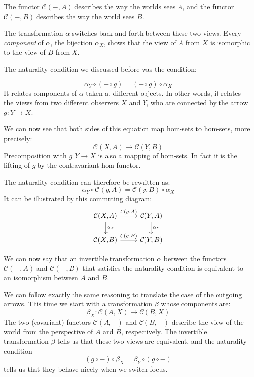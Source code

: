 \documentclass[DaoFP]{subfiles}
\begin{document}
The functor $\mathcal{C}(-, A)$ describes the way the worlds sees $A$, and the functor $\mathcal{C}(-, B)$ describes the way the world sees $B$. 

The transformation $\alpha$ switches back and forth between these two views. Every \emph{component} of $\alpha$, the bijection $\alpha_X$, shows that the view of $A$ from $X$ is isomorphic to the view of $B$ from $X$. 

The naturality condition we discussed before was the condition:

\[ \alpha_Y \circ (- \circ g) = (- \circ g) \circ \alpha_X \]
It relates components of $\alpha$ taken at different objects. In other words, it relates the views from two different observers $X$ and $Y$, who are connected by the arrow $g \colon Y \to X$. 

We can now see that both sides of this equation map hom-sets to hom-sets, more precisely:
\[\mathcal{C}(X, A) \to \mathcal{C}(Y, B)\]
Precomposition with $g \colon Y \to X$ is also a mapping of hom-sets. In fact it is the lifting of $g$ by the contravariant hom-functor. 

The naturality condition can therefore be rewritten as:
\[ \alpha_Y \circ \mathcal{C}(g, A) = \mathcal{C}(g, B) \circ \alpha_X \]
It can be illustrated by this commuting diagram:
\[
 \begin{tikzcd}
 \mathcal{C}(X, A)
 \arrow[d, "\alpha_X"]
 \arrow[r, "{\mathcal{C}(g, A)}"]
 &
 \mathcal{C}(Y, A)
  \arrow[d, "\alpha_Y"]
 \\
 \mathcal{C}(X, B)
 \arrow[r, "{\mathcal{C}(g, B)}"]
& \mathcal{C}(Y, B)
 \end{tikzcd}
\]

We can now say that  an invertible transformation $\alpha$ between the functors $\mathcal{C}(-, A)$ and $\mathcal{C}(-, B)$ that satisfies the naturality condition is equivalent to an isomorphism between $A$ and $B$.

We can follow exactly the same reasoning to translate the case of the outgoing arrows. This time we start with a transformation $\beta$ whose components are:
\[ \beta_X \colon \mathcal{C}(A, X) \to \mathcal{C}(B, X) \]
The two (covariant) functors $\mathcal{C}(A, -)$ and $\mathcal{C}(B, -)$ describe the view of the world from the perspective of $A$ and $B$, respectively. The invertible transformation $\beta$ tells us that these two views are equivalent, and the naturality condition 
\[ (g \circ -) \circ \beta_X = \beta_Y \circ (g \circ -) \]
tells us that they behave nicely when we switch focus.
\end{document}
